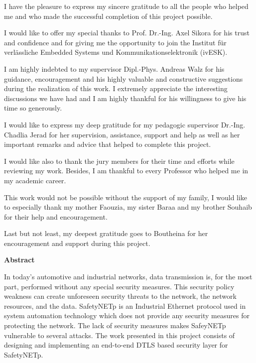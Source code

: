 I have the pleasure to express my sincere gratitude to all the people who helped me and who made the successful
completion of this project possible.

I would like to offer my special thanks to Prof. Dr.-Ing. Axel Sikora for his trust and confidence and for giving me the opportunity
to join the Institut für verlässliche Embedded Systems und Kommunikationselektronik (ivESK).

I am highly indebted to my supervisor Dipl.-Phys. Andreas Walz for his guidance, encouragement and his highly valuable and
constructive suggestions during the realization of this work. I extremely appreciate the interesting discussions we
have had and I am highly thankful for his willingness to give his time so generously.

I would like to express my deep gratitude for my pedagogic supervisor Dr.-Ing. Chadlia Jerad for her supervision, assistance, support
and help as well as her important remarks and advice that helped to complete this project.

I would like also to thank the jury members for their time and efforts while reviewing my work. Besides, I am thankful to every
Professor who helped me in my academic career.

This work would not be possible without the support of my family, I would like to especially thank my mother Faouzia, my sister Baraa
and my brother Souhaib for their help and encouragement.

Last but not least, my deepest gratitude goes to Boutheina for her encouragement and support during this project.

\newpage

\begin{center}
\textbf{\Large{Abstract}}
\end{center}
In today’s automotive and industrial networks, data transmission is, for the most part, performed
without any special security measures. This security policy weakness can create unforeseen security
threats to the network, the network resources, and the data.
SafetyNETp is an Industrial Ethernet protocol used in system automation technology which does not provide
any security measures for protecting the network. The lack of security measures makes SafeyNETp vulnerable to several attacks.
The work presented in this project consists of designing and implementing an end-to-end DTLS based security layer for SafetyNETp.


